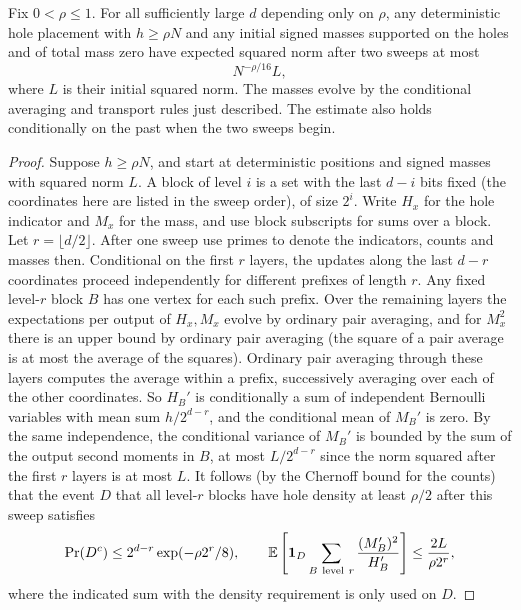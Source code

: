 \begin{lemma}\label{lem:reset-mass-contraction}
Fix $0<\rho\le1$. For all sufficiently large $d$ depending only on $\rho$, any deterministic hole placement with $h\ge\rho N$ and any initial signed masses supported on the holes and of total mass zero have expected squared norm after two sweeps at most
\[
 N^{-\rho/16}L,
\]
where $L$ is their initial squared norm. The masses evolve by the conditional averaging and transport rules just described. The estimate also holds conditionally on the past when the two sweeps begin.
\end{lemma}
\begin{proof}
Suppose \(h\ge\rho N\), and start at deterministic positions and signed masses with squared norm \(L\). A block of level \(i\) is a set with the last \(d-i\) bits fixed (the coordinates here are listed in the sweep order), of size \(2^i\). Write \(H_x\) for the hole indicator and \(M_x\) for the mass, and use block subscripts for sums over a block. Let \(r=\lfloor d/2\rfloor\). After one sweep use primes to denote the indicators, counts and masses then. Conditional on the first \(r\) layers, the updates along the last \(d-r\) coordinates proceed independently for different prefixes of length \(r\). Any fixed level-\(r\) block \(B\) has one vertex for each such prefix. Over the remaining layers the expectations per output of \(H_x, M_x\) evolve by ordinary pair averaging, and for \(M_x^2\) there is an upper bound by ordinary pair averaging (the square of a pair average is at most the average of the squares). Ordinary pair averaging through these layers computes the average within a prefix, successively averaging over each of the other coordinates. So \(H_B'\) is conditionally a sum of independent Bernoulli variables with mean sum \(h/2^{d-r}\), and the conditional mean of \(M_B'\) is zero. By the same independence, the conditional variance of \(M_B'\) is bounded by the sum of the output second moments in \(B\), at most \(L/2^{d-r}\) since the norm squared after the first \(r\) layers is at most \(L\). It follows (by the Chernoff bound for the counts) that the event \(D\) that all level-\(r\) blocks have hole density at least \(\rho/2\) after this sweep satisfies
\[
\Pr(D^c)\le 2^{d-r}\exp(-\rho 2^r/8),\qquad
\mathbb E\left[{\bf1}_D\sum_{B\ {\rm level}\ r}\frac{(M_B')^2}{H_B'}\right]\le \frac{2L}{\rho 2^r},
\]
where the indicated sum with the density requirement is only used on \(D\).


\end{proof}
